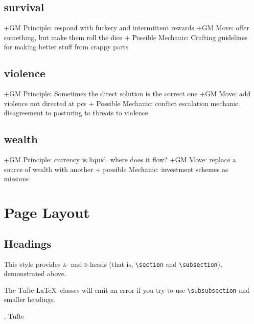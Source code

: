 \documentclass{tufte-handout}
\begin{document}
\subsection{survival}
+GM Principle: respond with fuckery and intermittent rewards
+GM Move:  offer something, but make them roll the dice
+ Possible Mechanic: Crafting guidelines for making better stuff from crappy parts

\subsection{violence}
+GM Principle: Sometimes the direct solution is the correct one
+GM Move: 	add violence not directed at pcs
+ Possible Mechanic: conflict escalation mechanic. disagreement to posturing to threats to violence 

\subsection{wealth}
+GM Principle: currency is liquid. where does it flow?
+GM Move: replace a source of wealth with another	
+ possible Mechanic: investment schemes as missions 


\section{Page Layout}\label{sec:page-layout}
\subsection{Headings}\label{sec:headings}
This style provides \textsc{a}- and \textsc{b}-heads (that is,
\Verb|\section| and \Verb|\subsection|), demonstrated above.

The Tufte-\LaTeX\ classes will emit an error if you try to use
\linebreak\Verb|\subsubsection| and smaller headings.

,\cite{Tufte2006} Tufte



\end{document}
